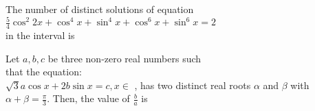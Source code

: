 \iffalse
\title{Trignometric Functions and Equations}
\author{EE24BTECH11007- ARNAV MAKARAND YADNOPAVIT}
\section{integer}
\fi
\item The number of distinct solutions of equation
$\frac{5}{4}\cos^2 2x+\cos^4 x+\sin^4 x+\cos^6 x+\sin^6 x=2$
\\in the interval  is\hfill{} 
\item Let $a, b, c$ be three non-zero real numbers such
\\that the equation:
\\$\sqrt{3} a\cos x+2b\sin x = c,x\in$ 
, has two distinct real roots $\alpha$ and $\beta$ with $\alpha+\beta=\frac{\pi}{3}$. Then, the value of $\frac{b}{a}$ is
\hfill{}
